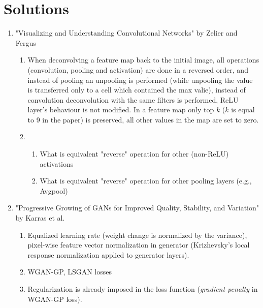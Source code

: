 \documentclass{article}
\begin{document}
\section{Solutions}
\begin{enumerate}
	\item "Visualizing and Understanding Convolutional Networks" by Zelier and Fergus \begin{enumerate}
		
		\item When deconvolving a feature map back to the initial image, all operations (convolution, pooling and activation) are done in a reversed order, and instead of pooling an unpooling is performed (while unpooling the value is transferred only to a cell which contained the max valie), instead of convolution deconvolution with the same filters is performed, ReLU layer's behaviour is not modified. In a feature map only top $k$ ($k$ is equal to 9 in the paper) is preserved, all other values in the map are set to zero. 
		\item
			\begin{enumerate}
				
				\item What is equivalent "reverse" operation for other (non-ReLU) activations
				\item What is equivalent "reverse" operation for other pooling layers (e.g., Avgpool)

			\end{enumerate}
	
		\end{enumerate} 
	\item "Progressive Growing of GANs for Improved Quality, Stability, and Variation" by Karras et al.
		\begin{enumerate}
			\item Equalized learning rate (weight change is normalized by the variance), pixel-wise feature vector normalization in generator (Krizhevsky's local response normalization applied to generator layers).
			\item WGAN-GP, LSGAN losses
			\item Regularization is already imposed in the loss function (\textit{gradient penalty} in WGAN-GP loss).
		\end{enumerate}
\end{enumerate}
\end{document}
